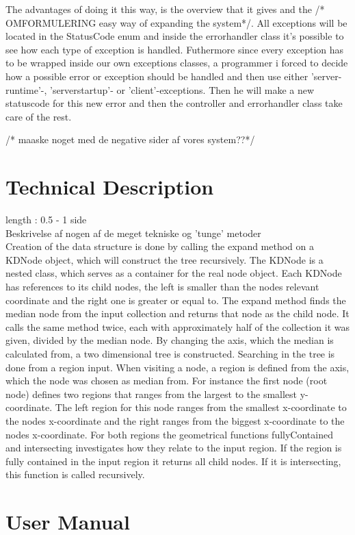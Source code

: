 \documentclass[a4paper,10pt,titlepage]{article}
\begin{document}
			The advantages of doing it this way, is the overview that it gives and the /* OMFORMULERING easy way of expanding the system*/. All exceptions will be located in the StatusCode enum and inside the errorhandler class it's possible to see how each type of exception is handled. Futhermore since every exception has to be wrapped inside our own exceptions classes, a programmer i forced to decide how a possible error or exception should be handled and then use either 'server-runtime'-, 'serverstartup'- or 'client'-exceptions. Then he will make a new statuscode for this new error and then the controller and errorhandler class take care of the rest.
			
			/* maaske noget med de negative sider af vores system??*/ 	
	\newpage		
	\section{Technical Description}
		length : 0.5 - 1 side\\
		Beskrivelse af nogen af de meget tekniske og 'tunge' metoder\\
Creation of the data structure is done by calling the expand method on a KDNode object, which will construct the tree recursively. The KDNode is a nested class, which serves as a container for the real node object. Each KDNode has references to its child nodes, the left is smaller than the nodes relevant coordinate and the right one is greater or equal to. The expand method finds the median node from the input collection and returns that node as the child node. It calls the same method twice, each with approximately half of the collection it was given, divided by the median node. By changing the axis, which the median is calculated from, a two dimensional tree is constructed.
Searching in the tree is done from a region input. When visiting a node, a region is defined from the axis, which the node was chosen as median from. For instance the first node (root node) defines two regions that ranges from the largest to the smallest y-coordinate. The left region for this node ranges from the smallest x-coordinate to the nodes x-coordinate and the right ranges from the biggest x-coordinate to the nodes x-coordinate. For both regions the geometrical functions fullyContained and intersecting investigates how they relate to the input region. If the region is fully contained in the input region it returns all child nodes. If it is intersecting, this function is called recursively.
			
	\newpage
	\section{User Manual}
\end{document}
